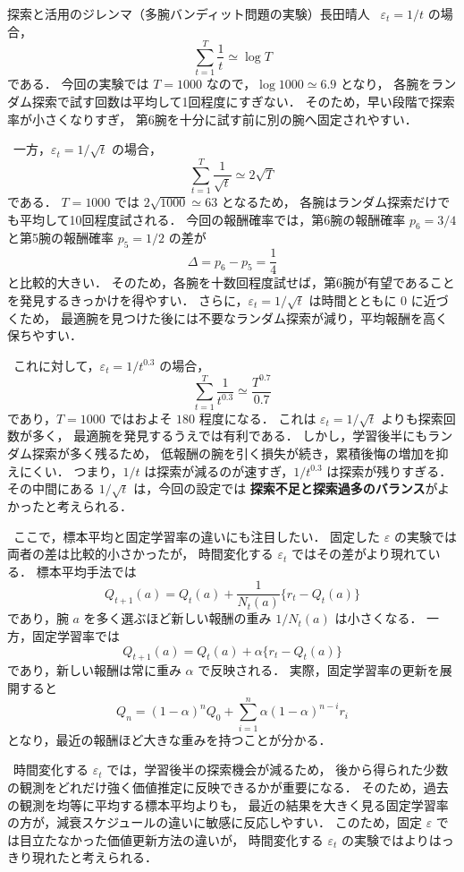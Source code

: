 \begin{column}{探索と活用のジレンマ（多腕バンディット問題の実験）}{長田晴人}
\ $\varepsilon_t=1/t$ の場合，
\[
    \sum_{t=1}^{T}\frac{1}{t}
    \simeq
    \log T
\]
である．
今回の実験では $T=1000$ なので，$\log 1000 \simeq 6.9$ となり，
各腕をランダム探索で試す回数は平均して1回程度にすぎない．
そのため，早い段階で探索率が小さくなりすぎ，
第6腕を十分に試す前に別の腕へ固定されやすい．

\ 一方，$\varepsilon_t=1/\sqrt{t}$ の場合，
\[
    \sum_{t=1}^{T}\frac{1}{\sqrt{t}}
    \simeq
    2\sqrt{T}
\]
である．
$T=1000$ では $2\sqrt{1000}\simeq 63$ となるため，
各腕はランダム探索だけでも平均して10回程度試される．
今回の報酬確率では，第6腕の報酬確率 $p_6=3/4$ と第5腕の報酬確率 $p_5=1/2$ の差が
\[
    \Delta=p_6-p_5=\frac{1}{4}
\]
と比較的大きい．
そのため，各腕を十数回程度試せば，第6腕が有望であることを発見するきっかけを得やすい．
さらに，$\varepsilon_t=1/\sqrt{t}$ は時間とともに $0$ に近づくため，
最適腕を見つけた後には不要なランダム探索が減り，平均報酬を高く保ちやすい．

\ これに対して，$\varepsilon_t=1/t^{0.3}$ の場合，
\[
    \sum_{t=1}^{T}\frac{1}{t^{0.3}}
    \simeq
    \frac{T^{0.7}}{0.7}
\]
であり，$T=1000$ ではおよそ $180$ 程度になる．
これは $\varepsilon_t=1/\sqrt{t}$ よりも探索回数が多く，
最適腕を発見するうえでは有利である．
しかし，学習後半にもランダム探索が多く残るため，
低報酬の腕を引く損失が続き，累積後悔の増加を抑えにくい．
つまり，$1/t$ は探索が減るのが速すぎ，$1/t^{0.3}$ は探索が残りすぎる．
その中間にある $1/\sqrt{t}$ は，今回の設定では
\textbf{探索不足と探索過多のバランス}がよかったと考えられる．

\ ここで，標本平均と固定学習率の違いにも注目したい．
固定した $\varepsilon$ の実験では両者の差は比較的小さかったが，
時間変化する $\varepsilon_t$ ではその差がより現れている．
標本平均手法では
\[
    Q_{t+1}(a)
    =
    Q_t(a)
    +
    \frac{1}{N_t(a)}\{r_t-Q_t(a)\}
\]
であり，腕 $a$ を多く選ぶほど新しい報酬の重み $1/N_t(a)$ は小さくなる．
一方，固定学習率では
\[
    Q_{t+1}(a)
    =
    Q_t(a)
    +
    \alpha\{r_t-Q_t(a)\}
\]
であり，新しい報酬は常に重み $\alpha$ で反映される．
実際，固定学習率の更新を展開すると
\[
    Q_n
    =
    (1-\alpha)^nQ_0
    +
    \sum_{i=1}^{n}\alpha(1-\alpha)^{n-i}r_i
\]
となり，最近の報酬ほど大きな重みを持つことが分かる．

\ 時間変化する $\varepsilon_t$ では，学習後半の探索機会が減るため，
後から得られた少数の観測をどれだけ強く価値推定に反映できるかが重要になる．
そのため，過去の観測を均等に平均する標本平均よりも，
最近の結果を大きく見る固定学習率の方が，減衰スケジュールの違いに敏感に反応しやすい．
このため，固定 $\varepsilon$ では目立たなかった価値更新方法の違いが，
時間変化する $\varepsilon_t$ の実験ではよりはっきり現れたと考えられる．


\end{column}
